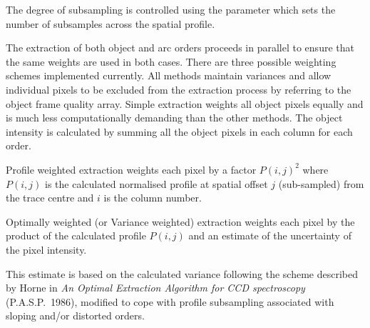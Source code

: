 The degree of subsampling is controlled using the parameter
 which sets the number of
subsamples across the spatial profile.





The extraction of both object and arc orders proceeds in parallel to ensure
that the same weights are used in both cases. There are three possible
weighting schemes implemented currently. All methods maintain variances and
allow individual pixels to be excluded from the extraction process by
referring to the object frame quality array.
Simple extraction weights all object pixels equally and is much less
computationally demanding than the other methods. The object intensity is
calculated by summing all the object pixels in each column for each order.

Profile weighted extraction weights each pixel by a factor $P(i,j)^{2}$ where
$P(i,j)$ is the calculated normalised profile at spatial offset $j$
(sub-sampled) from the trace centre and $i$ is the column number.

Optimally weighted (or Variance weighted) extraction weights each pixel by
the product of the calculated profile $P(i,j)$ and an estimate of the
uncertainty of the pixel intensity.

This estimate is based on the calculated variance following the scheme
described by Horne in {\sl An Optimal Extraction Algorithm for CCD
spectroscopy}
(P.A.S.P.~1986), modified to cope with profile subsampling associated with
sloping and/or distorted orders.

